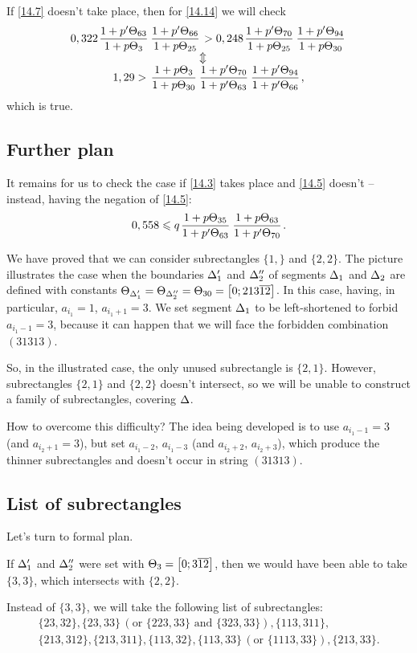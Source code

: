 If \ref{14.7} doesn't take place, then for \ref{14.14} we will check
\begin{gather*}
	0,322 \pu{63}{3} \pu{66}{25} > 0,248 \pu{70}{25} \pu{94}{30}\\
	\ArrowBetweenLines
	1,29 > \uu{3}{30} \pp{70}{63} \pp{94}{66},
\end{gather*}
which is true.

\subsection{Further plan}

It remains for us to check the case if \ref{14.3} takes place and \ref{14.5} doesn't --
instead, having the negation of \ref{14.5}:
\begin{equation}\label{14.15}
	0,558 \leqslant q \up{35}{63} \up{63}{70}.
\end{equation}

We have proved that we can consider subrectangles $\{1,\}$ and $\{2, 2\}$.
The picture illustrates the case when
the boundaries $\Delta_1'$ and $\Delta_2''$ of segments $\Delta_1$ and $\Delta_2$ are defined
with constants $\Theta_{\Delta_1'} = \Theta_{\Delta_2''} = \Theta_{30} = \left[0; 213\overline{12}\right]$.
In this case, having, in particular, $a_{i_1} = 1$, $a_{i_1 + 1} = 3$.
We set segment $\Delta_1$ to be left-shortened to forbid $a_{i_1 - 1} = 3$,
because it can happen that we will face the forbidden combination $(31313)$.

So, in the illustrated case, the only unused subrectangle is $\{2, 1\}$.
However, subrectangles $\{2, 1\}$ and $\{2, 2\}$ doesn't intersect,
so we will be unable to construct a family of subrectangles, covering $\Delta$.

How to overcome this difficulty?
The idea being developed is to use $a_{i_1 - 1} = 3$ (and $a_{i_2 + 1} = 3$),
but set $a_{i_1 - 2},\, a_{i_1 - 3}$ (and $a_{i_2 + 2},\, a_{i_2 + 3}$),
which produce the thinner subrectangles and doesn't occur in string $(31313)$.

\subsection{List of subrectangles}

Let's turn to formal plan.

If $\Delta_1'$ and $\Delta_2''$ were set with $\Theta_{3} = \left[0; 3\overline{12}\right]$,
then we would have been able to take $\{3, 3\}$, which intersects with $\{2, 2\}$.

Instead of $\{3, 3\}$, we will take the following list of subrectangles:
\begin{gather*}
	\{23, 32\}, \{23, 33\} \,(\text{or } \{223, 33\} \text{ and } \{323, 33\}), \{113, 311\},\\
	\{213, 312\}, \{213, 311\}, \{113, 32\}, \{113, 33\} \,(\text{or } \{1113, 33\}), \{213, 33\}.
\end{gather*}

